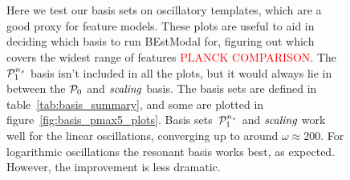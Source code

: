\begin{figure}[!pth]
\centering
{}\\
\\
\caption{
    Here we test our basis sets on oscillatory templates, which are a good proxy for feature models.
    These plots are useful to aid in deciding which basis to run BEstModal for,
    figuring out which covers the widest range of features \textcolor{red}{PLANCK COMPARISON}.
    The $\mathcal{P}^{n_s}_1$ basis isn't included in all the plots, but it would always lie in between
    the $\mathcal{P}_0$ and $\textit{scaling}$ basis.
    The basis sets are defined in table~\ref{tab:basis_summary},
    and some are plotted in figure~\ref{fig:basis_pmax5_plots}.
    Basis sets~$\mathcal{P}^{n_s}_1$ and $\textit{scaling}$ work well for the linear oscillations,
    converging up to around $\omega\approx200$.
    For logarithmic oscillations the resonant basis works best, as expected.
    However, the improvement is less dramatic.
    }\label{fig:plot_freq_scan}
\end{figure}
